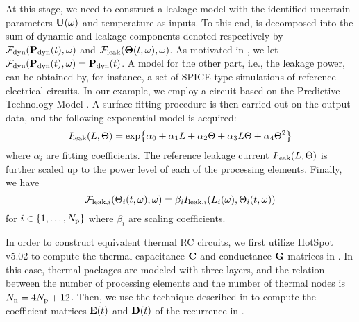 At this stage, we need to construct a leakage model with the identified uncertain parameters $\mathbf{U}(\omega)$ and temperature as inputs. To this end,  is decomposed into the sum of dynamic and leakage components denoted respectively by $\mathcal{F}_{\text{dyn}}(\mathbf{P}_{\text{dyn}}(t), \omega)$ and $\mathcal{F}_{\text{leak}}({\boldsymbol\Theta}(t, \omega), \omega)$. As motivated in , we let $\mathcal{F}_{\text{dyn}}(\mathbf{P}_{\text{dyn}}(t), \omega) = \mathbf{P}_{\text{dyn}}(t)$. A model for the other part, i.e., the leakage power, can be obtained by, for instance, a set of SPICE-type simulations of reference electrical circuits. In our example, we employ a circuit based on the Predictive Technology Model \cite{ptm}. A surface fitting procedure is then carried out on the output data, and the following exponential model is acquired:
\begin{equation} \elabel{leakage-current}
  I_\leak(\Leff, \T) = \text{exp} \big\{ \alpha_0 + \alpha_1 \Leff + \alpha_2 \T + \alpha_3 \Leff \T + \alpha_4 \T^2 \big\}
\end{equation}
where $\alpha_i$ are fitting coefficients. The reference leakage current $I_{\text{leak}}(L, \Theta)$ is further scaled up to the power level of each of the processing elements. Finally, we have
\[
  \mathcal{F}_{\text{leak}, i}(\Theta_i(t, \omega), \omega) = \beta_i I_{\text{leak}, i}(L_i(\omega), \Theta_i(t, \omega))
\]
for $i \in \{ 1, \dotsc, {N_\text{p}} \}$ where $\beta_i$ are scaling coefficients.

In order to construct equivalent thermal RC circuits, we first utilize HotSpot v5.02 \cite{hotspot} to compute the thermal capacitance $\mC$ and conductance $\mG$ matrices in . In this case, thermal packages are modeled with three layers, and the relation between the number of processing elements and the number of thermal nodes is $N_\text{n} = 4 {N_\text{p}} + 12$. Then, we use the technique described in \cite{ukhov2012} to compute the coefficient matrices $\mE(\t)$ and $\mD(\t)$ of the recurrence in .
